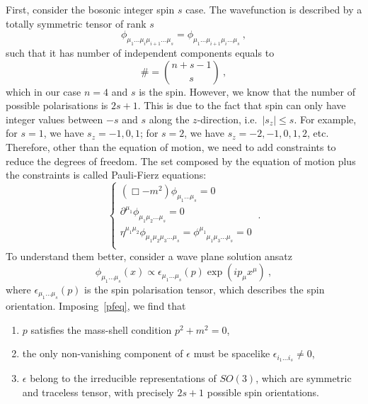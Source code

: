     First, consider the bosonic integer spin $s$ case. The wavefunction is described by a totally symmetric tensor of rank $s$ 
    \begin{equation*}
        \phi_{\mu_1 \ldots \mu_i \mu_{i+1} \ldots \mu_s} = \phi_{\mu_1 \ldots \mu_{i+1} \mu_i \ldots \mu_s} ~,
    \end{equation*}
    such that it has number of independent components equals to
    \begin{equation}\label{comp}
        \# = \binom{n+s-1}{s} ~,
    \end{equation}
    which in our case $n = 4$ and $s$ is the spin. However, we know that the number of possible polarisations is $2s+1$. This is due to the fact that spin can only have integer values between $-s$ and $s$ along the $z$-direction, i.e.~$|s_z| \leq s$. For example, for $s = 1$, we have $s_z = -1, 0, 1$; for $s=2$, we have $s_z = -2, -1, 0, 1, 2$, etc. Therefore, other than the equation of motion, we need to add constraints to reduce the degrees of freedom. The set composed by the equation of motion plus the constraints is called Pauli-Fierz equations:
    \begin{equation}\label{pfeq}
        \begin{cases}
            (\Box - m^2) \phi_{\mu_1 \ldots \mu_s} = 0 \\
            \partial^{\mu_1} \phi_{\mu_1 \mu_2 \ldots \mu_s} = 0 \\
            \eta^{\mu_1 \mu_2} \phi_{\mu_1 \mu_2 \mu_3 \ldots \mu_s} = \phi^{\mu_1}_{\phantom{\mu_1} \mu_1 \mu_3 \ldots \mu_s} = 0 \\
        \end{cases} ~.
    \end{equation}
    To understand them better, consider a wave plane solution ansatz 
    \begin{equation*}
        \phi_{\mu_1 \ldots \mu_s} (x) \propto \epsilon_{\mu_1 \ldots \mu_s} (p) \exp(i p_\mu x^\mu) ~,
    \end{equation*}
    where $\epsilon_{\mu_1 \ldots \mu_s} (p) $ is the spin polarisation tensor, which describes the spin orientation. Imposing~\eqref{pfeq}, we find that 
    \begin{enumerate}
        \item $p$ satisfies the mass-shell condition $p^2 + m^2 = 0$,
        \item the only non-vanishing component of $\epsilon$ must be spacelike $\epsilon_{i_1 \ldots i_s} \neq 0$,
        \item $\epsilon$ belong to the irreducible representations of $SO(3)$, which are symmetric and traceless tensor, with precisely $2s+1$ possible spin orientations.
    \end{enumerate}
